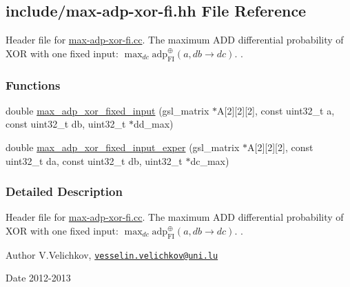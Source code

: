 \hypertarget{max-adp-xor-fi_8hh}{\subsection{include/max-\/adp-\/xor-\/fi.hh \-File \-Reference}
\label{max-adp-xor-fi_8hh}
}


\-Header file for \hyperlink{max-adp-xor-fi_8cc}{max-\/adp-\/xor-\/fi.\-cc}. \-The maximum \-A\-D\-D differential probability of \-X\-O\-R with one fixed input\-: $\max_{dc} \mathrm{adp}^{\oplus}_{\mathrm{FI}}(a, db \rightarrow dc)$. .  


\subsubsection*{\-Functions}
\begin{DoxyCompactItemize}
\item 
double \hyperlink{max-adp-xor-fi_8hh_ab2a3ba6507c5a4b456487c3f8009511b}{max\-\_\-adp\-\_\-xor\-\_\-fixed\-\_\-input} (gsl\-\_\-matrix $\ast$\-A\mbox{[}2\mbox{]}\mbox{[}2\mbox{]}\mbox{[}2\mbox{]}, const uint32\-\_\-t a, const uint32\-\_\-t db, uint32\-\_\-t $\ast$dd\-\_\-max)
\item 
double \hyperlink{max-adp-xor-fi_8hh_a89f21fea615e80c454283ef53d463668}{max\-\_\-adp\-\_\-xor\-\_\-fixed\-\_\-input\-\_\-exper} (gsl\-\_\-matrix $\ast$\-A\mbox{[}2\mbox{]}\mbox{[}2\mbox{]}\mbox{[}2\mbox{]}, const uint32\-\_\-t da, const uint32\-\_\-t db, uint32\-\_\-t $\ast$dc\-\_\-max)
\end{DoxyCompactItemize}


\subsubsection{\-Detailed \-Description}
\-Header file for \hyperlink{max-adp-xor-fi_8cc}{max-\/adp-\/xor-\/fi.\-cc}. \-The maximum \-A\-D\-D differential probability of \-X\-O\-R with one fixed input\-: $\max_{dc} \mathrm{adp}^{\oplus}_{\mathrm{FI}}(a, db \rightarrow dc)$. . \begin{DoxyAuthor}{\-Author}
\-V.\-Velichkov, \href{mailto:vesselin.velichkov@uni.lu}{\tt vesselin.\-velichkov@uni.\-lu} 
\end{DoxyAuthor}
\begin{DoxyDate}{\-Date}
2012-\/2013 
\end{DoxyDate}


